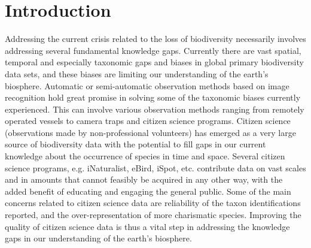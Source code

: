 \documentclass{article}
\begin{document}
\section*{Introduction}
Addressing the current crisis related to the loss of biodiversity necessarily involves addressing several fundamental knowledge gaps\autocite{Xu2021, Pereira2013}. Currently there are vast spatial, temporal and especially taxonomic gaps and biases in global primary biodiversity data sets, and these biases are limiting our understanding of the earth's biosphere\autocite{RochaOrtega2021, Beck2014,Troudet2017, GBIFtrends}. Automatic or semi-automatic observation methods based on image recognition hold great promise in solving some of the taxonomic biases currently experienced\autocite{Christin2019}. This can involve various observation methods ranging from remotely operated vessels to camera traps and citizen science programs\autocite{Bertacchi2019,Tollefson2016,August2015}. Citizen science (observations made by non-professional volunteers\autocite{Silvertown2009}) has emerged as a very large source of biodiversity data with the potential to fill gaps in our current knowledge about the occurrence of species in time and space\autocite{Chandler2017,Theobald2015,Pocock2018}. Several citizen science programs, e.g. iNaturalist, eBird, iSpot, etc.\autocite{Chandler2017Book} contribute data on vast scales and in amounts that cannot feasibly be acquired in any other way, with the added benefit of educating and engaging the general public\autocite{Trouille2019,Bonney2015,Schuttler2018}. Some of the main concerns related to citizen science data are reliability of the taxon identifications reported\autocite{Crall2011,Burgess2017}, and the over-representation of more charismatic species\autocite{Callaghan2020,Bayraktarov2019,Boakes2016}. Improving the quality of citizen science data is thus a vital step in addressing the knowledge gaps in our understanding of the earth's biosphere.
\end{document}

